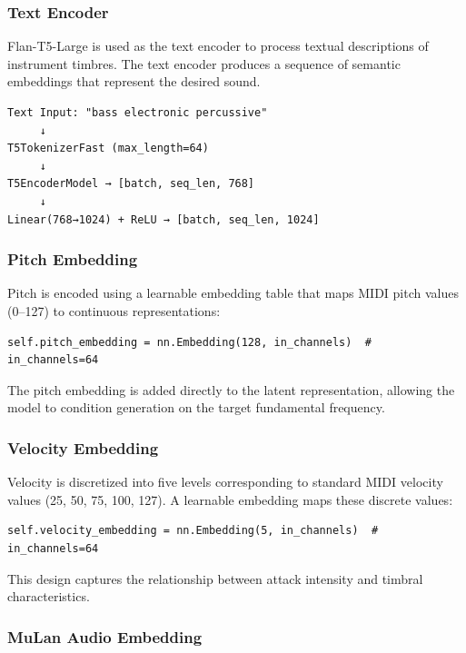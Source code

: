 \documentclass[11pt,a4paper]{article}
\begin{document}
\subsubsection{Text Encoder}

Flan-T5-Large is used as the text encoder to process textual descriptions of instrument timbres. The text encoder produces a sequence of semantic embeddings that represent the desired sound.

\begin{verbatim}
Text Input: "bass electronic percussive"
     ↓
T5TokenizerFast (max_length=64)
     ↓
T5EncoderModel → [batch, seq_len, 768]
     ↓
Linear(768→1024) + ReLU → [batch, seq_len, 1024]
\end{verbatim}

\subsubsection{Pitch Embedding}

Pitch is encoded using a learnable embedding table that maps MIDI pitch values (0--127) to continuous representations:

\begin{verbatim}
self.pitch_embedding = nn.Embedding(128, in_channels)  # in_channels=64
\end{verbatim}

The pitch embedding is added directly to the latent representation, allowing the model to condition generation on the target fundamental frequency.

\subsubsection{Velocity Embedding}

Velocity is discretized into five levels corresponding to standard MIDI velocity values (25, 50, 75, 100, 127). A learnable embedding maps these discrete values:

\begin{verbatim}
self.velocity_embedding = nn.Embedding(5, in_channels)  # in_channels=64
\end{verbatim}

This design captures the relationship between attack intensity and timbral characteristics.

\subsubsection{MuLan Audio Embedding}
\end{document}
